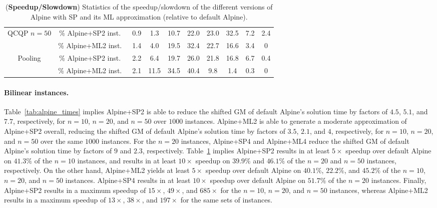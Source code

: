 \documentclass{article}
\begin{document}
\begin{table}[t]
{\begin{tabular}{ c | c | c c c c c c c c }
QCQP $n = 50$ & \% Alpine+SP2 inst.\  &  0.9  &  1.3  &  10.7  &  22.0  &  23.0  &  32.5  &  7.2  &  2.4 \\
& \% Alpine+ML2 inst.\  &  1.4  &  4.0  &  19.5  &  32.4  &  22.7  &  16.6  &  3.4  &  0 \\[0.1in]
Pooling & \% Alpine+SP2 inst.\  &  2.2  &  6.4  &  19.7  &  26.0  &  21.8  &  16.8  &  6.7  &  0.4 \\
& \% Alpine+ML2 inst.\  &  2.1  &  11.5  &  34.5  &  40.4  &  9.8  &  1.4  &  0.3  &  0 \\ \hline
\end{tabular}%
}
\caption{
(\textbf{Speedup/Slowdown}) Statistics of the speedup/slowdown of the different versions of Alpine with SP and its ML approximation (relative to default Alpine).
}
\label{tab:alpine_speedup}
\end{table}





\paragraph{Bilinear instances.}
Table~\ref{tab:alpine_times} implies Alpine+SP2 is able to reduce the shifted GM of default Alpine's solution time by factors of $4.5$, $5.1$, and $7.7$, respectively, for $n = 10$, $n = 20$, and $n = 50$ over $1000$ instances.
Alpine+ML2 is able to generate a moderate approximation of Alpine+SP2 overall, reducing the shifted GM of default Alpine's solution time by factors of $3.5$, $2.1$, and $4$, respectively, for $n = 10$, $n = 20$, and $n = 50$ over the same $1000$ instances.
For the $n = 20$ instances, Alpine+SP4 and Alpine+ML4 reduce the shifted GM of default Alpine's solution time by factors of $9$ and $2.3$, respectively.
Table~\ref{tab:alpine_speedup} implies Alpine+SP2 results in at least $5\times$ speedup over default Alpine on $41.3\%$ of the $n = 10$ instances, and results in at least $10\times$ speedup on $39.9\%$ and $46.1\%$ of the $n = 20$ and $n = 50$ instances, respectively.
On the other hand, Alpine+ML2 yields at least $5\times$ speedup over default Alpine on $40.1\%$, $22.2\%$, and $45.2\%$ of the $n = 10$, $n = 20$, and $n = 50$ instances.
Alpine+SP4 results in at least $10\times$ speedup over default Alpine on $51.7\%$ of the $n = 20$ instances.
Finally, Alpine+SP2 results in a maximum speedup of $15\times$, $49\times$, and $685\times$ for the $n = 10$, $n = 20$, and $n = 50$ instances, whereas Alpine+ML2 results in a maximum speedup of $13\times$, $38\times$, and $197\times$ for the same sets of instances.
\end{document}
